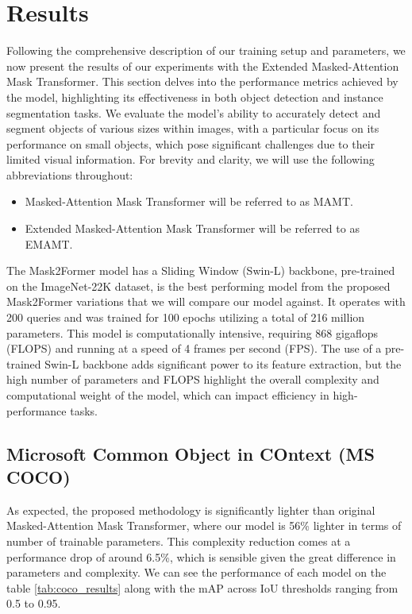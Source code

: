 \newpage

\section{Results}

Following the comprehensive description of our training setup and parameters, we now present the results of our experiments with the Extended Masked-Attention 
Mask Transformer. This section delves into the performance metrics achieved by the model, highlighting its effectiveness in both object detection and instance 
segmentation tasks. We evaluate the model's ability to accurately detect and segment objects of various sizes within images, with a particular focus on its 
performance on small objects, which pose significant challenges due to their limited visual information. For brevity and clarity, we will use the following 
abbreviations throughout:

\begin{itemize}
    \item Masked-Attention Mask Transformer will be referred to as MAMT.
    \item Extended Masked-Attention Mask Transformer will be referred to as EMAMT.
\end{itemize}


The Mask2Former model has a Sliding Window (Swin-L) \cite{swin} backbone, pre-trained on the ImageNet-22K dataset, is the best performing model from the proposed 
Mask2Former variations that we will compare our model against. It operates with 200 queries and was trained for 100 epochs utilizing a total of 216 million parameters. 
This model is computationally intensive, requiring 868 gigaflops (FLOPS) and running at a speed of 4 frames per second (FPS). The use of a pre-trained 
Swin-L backbone adds significant power to its feature extraction, but the high number of parameters and FLOPS highlight the overall complexity and 
computational weight of the model, which can impact efficiency in high-performance tasks.

\subsection{Microsoft Common Object in COntext (MS COCO)}

As expected, the proposed methodology is significantly lighter than original Masked-Attention Mask Transformer, where our model is 56\% lighter in terms of 
number of trainable parameters. This complexity reduction comes at a performance drop of around 6.5\%, which is sensible given the great difference in parameters
and complexity. We can see the performance of each model on the table \ref{tab:coco_results} along with the mAP across IoU thresholds ranging from 0.5 to 0.95.

